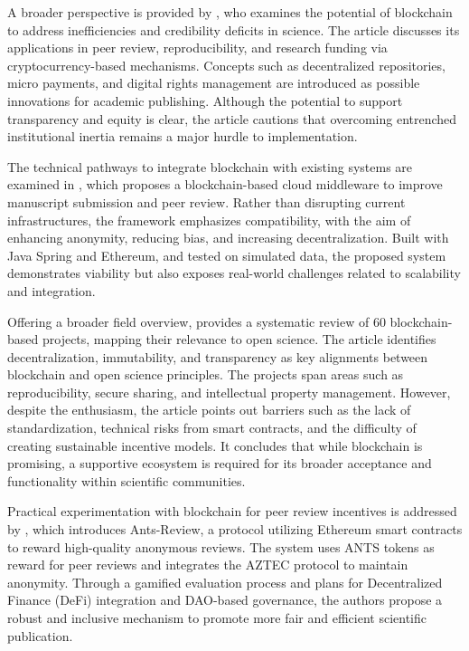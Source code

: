 \documentclass[final]{rc-book-2.14}
\begin{document}
A broader perspective is provided by \cite{van_rossum_blockchain_2018}, who examines the potential of blockchain to address inefficiencies and credibility deficits in science. The article discusses its applications in peer review, reproducibility, and research funding via cryptocurrency-based mechanisms. Concepts such as decentralized repositories, micro payments, and digital rights management are introduced as possible innovations for academic publishing. Although the potential to support transparency and equity is clear, the article cautions that overcoming entrenched institutional inertia remains a major hurdle to implementation.

The technical pathways to integrate blockchain with existing systems are examined in \cite{gazis_blockchain_2022}, which proposes a blockchain-based cloud middleware to improve manuscript submission and peer review. Rather than disrupting current infrastructures, the framework emphasizes compatibility, with the aim of enhancing anonymity, reducing bias, and increasing decentralization. Built with Java Spring and Ethereum, and tested on simulated data, the proposed system demonstrates viability but also exposes real-world challenges related to scalability and integration.

Offering a broader field overview, \cite{leible_review_2019} provides a systematic review of 60 blockchain-based projects, mapping their relevance to open science. The article identifies decentralization, immutability, and transparency as key alignments between blockchain and open science principles. The projects span areas such as reproducibility, secure sharing, and intellectual property management. However, despite the enthusiasm, the article points out barriers such as the lack of standardization, technical risks from smart contracts, and the difficulty of creating sustainable incentive models. It concludes that while blockchain is promising, a supportive ecosystem is required for its broader acceptance and functionality within scientific communities.

Practical experimentation with blockchain for peer review incentives is addressed by \cite{trovo_ants-review_2021}, which introduces Ants-Review, a protocol utilizing Ethereum smart contracts to reward high-quality anonymous reviews. The system uses ANTS tokens as reward for peer reviews and integrates the AZTEC protocol to maintain anonymity. Through a gamified evaluation process and plans for Decentralized Finance (DeFi) integration and DAO-based governance, the authors propose a robust and inclusive mechanism to promote more fair and efficient scientific publication.
\end{document}
